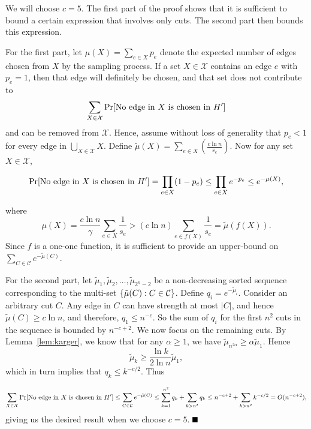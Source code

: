 \documentclass[11pt]{article}
\newcommand{\qed}{\mbox{}\hspace*{\fill}\nolinebreak\mbox{$\rule{0.6em}{0.6em}$}
}
\newenvironment{proofof}[1]{\noindent{\bf Proof of #1:}}{$\qed$\par}
\newcommand{\edgesets}{\mathcal X}
\begin{document}
\begin{proofof}{Theorem~\ref{thm:Benczur-Karger}}
  We will choose $c = 5$. The first part of the proof shows that it is
  sufficient to bound a certain expression that involves only cuts. The second
  part then bounds this expression.

  For the first part, let $\mu(X) = \sum_{e\in X} p_e$ denote the expected
  number of edges chosen from $X$ by the sampling process. If a set $X\in
  \edgesets$ contains an edge $e$ with $p_e = 1$, then that edge will
  definitely be chosen, and that set does not contribute to $$ \sum_{ X \in
    \edgesets } \Pr[ {\rm No~edge~in~}X~{\rm is~chosen~in~}H']$$ and can be
  removed from $\edgesets$. Hence, assume without loss of generality that $p_e
  < 1$ for every edge in $\bigcup _{X\in\edgesets}X$. Define $\tilde{\mu}(X) =
  \sum_{e\in X} \left(\frac{c\ln n}{s_e}\right)$. Now for any set $X\in
  \edgesets$,

  $$\Pr[ {\rm No~edge~in~}X~{\rm is~chosen~in~}H'] =
  \prod_{e\in X}(1-p_e) \le \prod_{e\in X}e^{-p_e} \le e^{-\mu(X)},$$

  where
  $$\mu(X) = \frac{c \ln n}{\gamma}\sum_{e\in X} \frac{1}{s_e} >
  (c\ln n) \sum_{e\in f(X)} \frac{1}{s_e} = \tilde{\mu}(f(X)).$$ Since $f$ is
  a one-one function, it is sufficient to provide an upper-bound on
  $\sum_{C\in{\mathcal C}}e^{-\tilde{\mu}(C)}$.

  For the second part, let $\tilde{\mu}_1,
  \tilde{\mu}_2,\ldots,\tilde{\mu}_{2^n-2}$ be a non-decreasing sorted
  sequence corresponding to the multi-set $\{\tilde{\mu}(C): C\in {\cal
    C}\}$. Define $q_i = e^{-\tilde{\mu}_i}$. Consider an arbitrary cut
  $C$. Any edge in $C$ can have strength at most $|C|$, and hence
  $\tilde{\mu}(C) \ge c \ln n$, and therefore, $q_1 \leq n^{-c}$. So the sum
  of $q_i$ for the first $n^2$ cuts in the sequence is bounded by
  $n^{-c+2}$. We now focus on the remaining cuts.  By Lemma~\ref{lem:karger},
  we know that for any $\alpha \geq 1$, we have $\tilde{\mu}_{n^{2\alpha}}
  \geq \alpha \tilde{\mu}_1$.  Hence
  $$ \tilde{\mu}_{k} \geq \frac{\ln k}{2 \ln n} \tilde{\mu}_1,$$
  which in turn implies that $q_k \leq k^{-c/2}$. Thus

  $$  \sum_{ X \in \edgesets } \Pr[ {\rm No~edge~in~}X~{\rm is~chosen~in~}H'] \leq \sum_{C\in{\mathcal C}}e^{-\tilde{\mu}(C)} \leq \sum_{k=1}^{n^2} q_k + \sum_{k > n^2} q_k \leq  n^{-c+2} +   \sum_{k > n^2} k^{-c/2} = O(n^{-c+2}),$$
  giving us the desired result when we choose $c = 5$.
\end{proofof}
\end{document}
